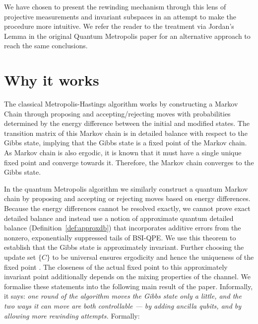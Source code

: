 \documentclass[aps,floatfix,10pt,amssymb,amsfont,amsmath,superscriptaddress,float,nofootinbib,longbibliography,nobalancelastpage,twocolumn]{revtex4-2}
\begin{document}
We have chosen to present the rewinding mechanism through this lens of projective measurements and invariant subspaces in an attempt to make the procedure more intuitive. We refer the reader to the treatment via Jordan's Lemma in the original Quantum Metropolis paper \cite{Temme_2011} for an alternative approach to reach the same conclusions.
\label{section:rejection}

\section{Why it works}
\label{section:why}
The classical Metropolis-Hastings algorithm works by constructing a Markov Chain through proposing and accepting/rejecting moves with probabilities determined by the energy difference between the initial and modified states. The transition matrix of this Markov chain is in detailed balance with respect to the Gibbs state, implying that the Gibbs state is a fixed point of the Markov chain. As Markov chain is also ergodic, it is known that it must have a single unique fixed point and converge towards it. Therefore, the Markov chain converges to the Gibbs state.

In the quantum Metropolis algorithm we similarly construct a quantum Markov chain by proposing and accepting or rejecting moves based on energy differences. Because the energy differences cannot be resolved exactly, we cannot prove exact detailed balance and instead use a notion of approximate quantum detailed balance (Definition~\ref{def:approxdb}) that incorporates additive errors from the nonzero, exponentially suppressed tails of BSI-QPE. We use this theorem to establish that the Gibbs state is approximately invariant. Further choosing the update set $\{C\}$ to be universal ensures ergodicity and hence the uniqueness of the fixed point \cite{Temme_2011}. The closeness of the actual fixed point to this approximately invariant point additionally depends on the mixing properties of the channel. We formalise these statements into the following main result of the paper. Informally, it says: \emph{one round of the algorithm moves the Gibbs state only a little, and the two ways it can move are both controllable --- by adding ancilla qubits, and by allowing more rewinding attempts.} Formally:
\end{document}
